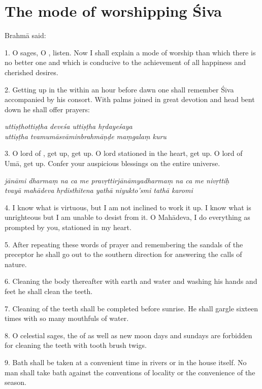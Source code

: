 \chapter{The mode of worshipping Śiva}

Brahmā said:

1. O sages, O , listen. Now I shall explain a mode of worship than
which there is no better one and which is conducive to the achievement of all
happiness and cherished desires.

2. Getting up in the  within an hour before dawn one shall
remember Śiva accompanied by his consort. With palms joined in great devotion
and head bent down he shall offer prayers:

\begin{shloka}\itshape
  uttiṣṭhottiṣṭha deveśa uttiṣṭha hṛdayeśaya\\
  uttiṣṭha tvamumāsvāminbrahmāṇḍe maṃgalaṃ kuru
\end{shloka}

3. O lord of , get up, get up. O lord stationed in the heart, get up.
O lord of Umā, get up. Confer your auspicious blessings on the entire universe.

\begin{shloka}\itshape
  jānāmi dharmaṃ na ca me pravṛttirjānāmyadharmaṃ na ca me nivṛttiḥ\\
  tvayā mahādeva hṛdisthitena yathā niyukto'smi tathā karomi
\end{shloka}

4. I know what is virtuous, but I am not inclined to work it up. I know what is
unrighteous but I am unable to desist from it. O Mahādeva, I do everything as
prompted by you, stationed in my heart.

5. After repeating these words of prayer and remembering the sandals of
the preceptor he shall go out to the southern direction for answering the calls
of nature.

6. Cleaning the body thereafter with earth and water and washing his hands and
feet he shall clean the teeth.

7. Cleaning of the teeth shall be completed before sunrise. He shall gargle
sixteen times with so many mouthfuls of water.

8. O celestial sages, the  of  as well as new moon
days and sundays are forbidden for cleaning the teeth with tooth brush twigs.

9. Bath shall be taken at a convenient time in rivers or in the house itself. No
man shall take bath against the conventions of locality or the convenience of
the season.

